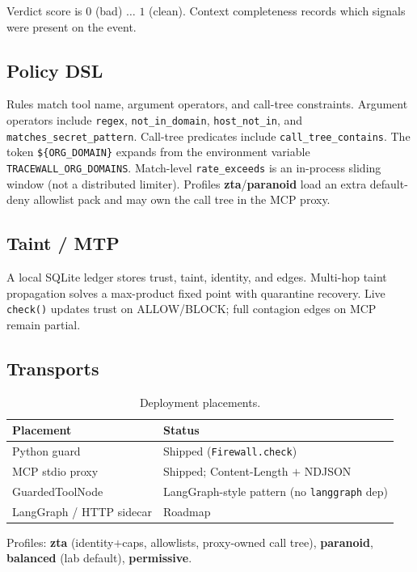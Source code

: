 \documentclass[conference]{IEEEtran}
\begin{document}
Verdict score is $0$ (bad) $\ldots$ $1$ (clean).
Context completeness records which signals were present on the event.

\subsection{Policy DSL}
Rules match tool name, argument operators, and call-tree constraints.
Argument operators include \texttt{regex}, \texttt{not\_in\_domain},
\texttt{host\_not\_in}, and \texttt{matches\_secret\_pattern}.
Call-tree predicates include \texttt{call\_tree\_contains}.
The token \texttt{\$\{ORG\_DOMAIN\}} expands from the environment variable
\texttt{TRACEWALL\_ORG\_DOMAINS}.
Match-level \texttt{rate\_exceeds} is an in-process sliding window
(not a distributed limiter). Profiles \textbf{zta}/\textbf{paranoid} load an
extra default-deny allowlist pack and may own the call tree in the MCP proxy.

\subsection{Taint / MTP}
A local SQLite ledger stores trust, taint, identity, and edges. Multi-hop taint
propagation solves a max-product fixed point with quarantine recovery.
Live \texttt{check()} updates trust on ALLOW/BLOCK; full contagion edges on MCP remain partial.

\subsection{Transports}
\begin{table}[!t]
\centering
\caption{Deployment placements.}
\label{tab:transports}
\small
\begin{tabular}{@{}p{}p{}@{}}
\toprule
Placement & Status \\
\midrule
Python guard & Shipped (\texttt{Firewall.check}) \\
MCP stdio proxy & Shipped; Content-Length $+$ NDJSON \\
GuardedToolNode & LangGraph-style pattern (no \texttt{langgraph} dep) \\
LangGraph / HTTP sidecar & Roadmap \\
\bottomrule
\end{tabular}
\end{table}
Profiles: \textbf{zta} (identity$+$caps, allowlists, proxy-owned call tree),
\textbf{paranoid}, \textbf{balanced} (lab default), \textbf{permissive}.
\end{document}
